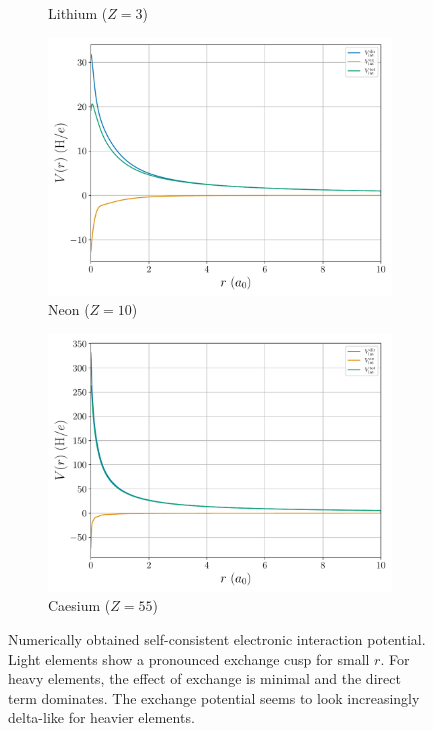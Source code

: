 \documentclass[a4paper,DIV=12,english]{scrartcl}
\begin{document}
\begin{figure}
\begin{subfigure}{0.49\textwidth}
        \caption{Lithium ($Z=3$)}
        \label{subfig:pot3}
    \end{subfigure}
    \begin{subfigure}{0.49\textwidth}
        \centering
        \includegraphics[width=\textwidth]{../plots/potentials/potential_10.pdf}
        \caption{Neon ($Z=10$)}
        \label{subfig:pot10}
    \end{subfigure}
    \begin{subfigure}{0.49\textwidth}
        \centering
        \includegraphics[width=\textwidth]{../plots/potentials/potential_55.pdf}
        \caption{Caesium ($Z=55$)}
        \label{subfig:pot55}
    \end{subfigure}
    \caption{Numerically obtained self-consistent electronic interaction potential. Light elements show a pronounced exchange cusp for small $r$. For heavy elements, the effect of exchange is minimal and the direct term dominates. The exchange potential seems to look increasingly delta-like for heavier elements.}
    \label{fig:pots}
\end{figure}
\end{document}
